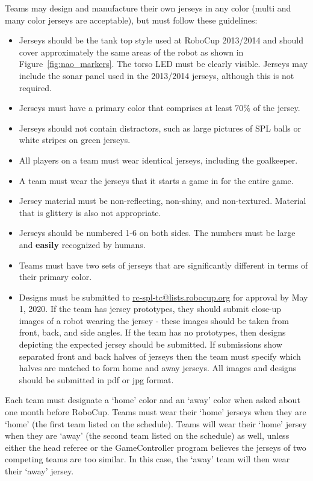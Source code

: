 \documentclass[12pt]{article}
\begin{document}
Teams may design and manufacture their own jerseys in any color (multi and many color jerseys are acceptable), but must follow these guidelines:
\begin{itemize}
\item Jerseys should be the tank top style used at RoboCup 2013/2014 and should cover approximately the same areas of the robot as shown in Figure~\ref{fig:nao_markers}.  The torso LED must be clearly visible.  Jerseys may include the sonar panel used in the 2013/2014 jerseys, although this is not required.
\item Jerseys must have a primary color that comprises at least 70\% of the jersey.
\item Jerseys should not contain distractors, such as large pictures of SPL balls or white stripes on green jerseys.
\item All players on a team must wear identical jerseys, including the goalkeeper.
\item A team must wear the jerseys that it starts a game in for the entire game.
\item Jersey material must be non-reflecting, non-shiny, and non-textured.  Material that is glittery is also not appropriate.
\item Jerseys should be numbered 1-6 on both sides.  The numbers must be large and {\bf easily} recognized by humans.
\item Teams must have two sets of jerseys that are significantly different in terms of their primary color.
\item Designs must be submitted to \url{rc-spl-tc@lists.robocup.org} for approval by May 1, 2020. If the team has jersey prototypes, they should submit close-up images of a robot wearing the jersey - these images should be taken from front, back, and side angles.  If the team has no prototypes, then designs depicting the expected jersey should be submitted.  If submissions show separated front and back halves of jerseys then the team must specify which halves are matched to form home and away jerseys.  All images and designs should be submitted in pdf or jpg format.
\end{itemize}

Each team must designate a `home' color and an `away' color when asked about one month before RoboCup.  Teams must wear their `home' jerseys when they are `home' (the first team listed on the schedule).  Teams will wear their `home' jersey when they are `away' (the second team listed on the schedule) as well, unless either the head referee or the GameController program believes the jerseys of two competing teams are too similar.  In this case, the `away' team will then wear their `away' jersey.
\end{document}
